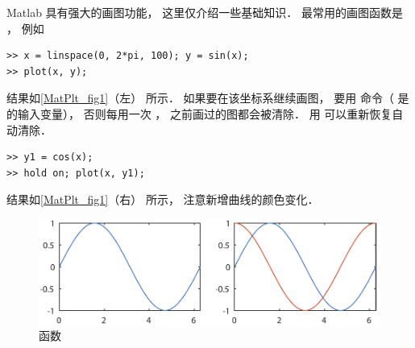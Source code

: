 

Matlab 具有强大的画图功能， 这里仅介绍一些基础知识． 最常用的画图函数是 ， 例如
\begin{lstlisting}[language=plain]
>> x = linspace(0, 2*pi, 100); y = sin(x);
>> plot(x, y);
\end{lstlisting}
结果如\autoref{MatPlt_fig1}（左） 所示． 如果要在该坐标系继续画图， 要用  命令（ 是  的输入变量）， 否则每用一次 ， 之前画过的图都会被清除． 用  可以重新恢复自动清除．
\begin{lstlisting}[language=plain]
>> y1 = cos(x);
>> hold on; plot(x, y1);
\end{lstlisting}
结果如\autoref{MatPlt_fig1}（右） 所示， 注意新增曲线的颜色变化．
\begin{figure}[ht]
\centering
\includegraphics[width=13cm]{./figures/MatPlt1.pdf}
\caption{ 函数} \label{MatPlt_fig1}
\end{figure}

